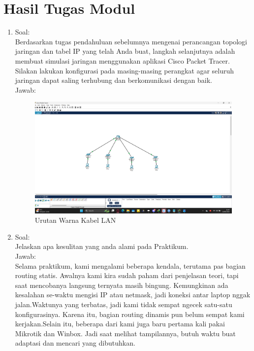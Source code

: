 \section{Hasil Tugas Modul}
\begin{enumerate}
    \item Soal:\\ Berdasarkan tugas pendahuluan sebelumnya mengenai perancangan topologi jaringan dan tabel IP yang telah Anda buat, langkah selanjutnya adalah membuat simulasi jaringan menggunakan aplikasi Cisco Packet Tracer. Silakan lakukan konfigurasi pada masing-masing perangkat agar seluruh jaringan dapat saling terhubung dan berkomunikasi dengan baik.
\\ Jawab: 
\begin{figure}[H]
    \centering
    \includegraphics[width=1\linewidth]{P1/img/3.png}
    \caption{Urutan Warna Kabel LAN}
    \label{fig:inirujukan}
  \end{figure}

\item Soal: \\ Jelaskan apa kesulitan yang anda alami pada Praktikum.
\\Jawab: \\
Selama praktikum, kami mengalami beberapa kendala, terutama pas bagian routing statis. Awalnya kami kira sudah paham dari penjelasan teori, tapi saat mencobanya langsung ternyata masih bingung. Kemungkinan ada kesalahan se-waktu mengisi IP atau netmask, jadi koneksi antar laptop nggak jalan.Waktunya yang terbatas, jadi kami tidak sempat ngecek satu-satu konfigurasinya. Karena itu, bagian routing dinamis pun belum sempat kami kerjakan.Selain itu, beberapa dari kami juga baru pertama kali pakai Mikrotik dan Winbox. Jadi saat melihat tampilannya, butuh waktu buat adaptasi dan mencari yang dibutuhkan.

\end{enumerate}

